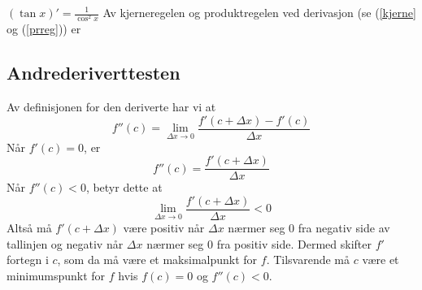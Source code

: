 {\boldmath $ (\tan x)'=\frac{1}{\cos^2 x} $}\bs
Av kjerneregelen og produktregelen ved derivasjon (se (\ref{kjerne} og (\ref{prreg})) er

\subsection*{Andrederiverttesten}
Av definisjonen for den deriverte har vi at
\[ f''(c)=\lim\limits_{\Delta x \to 0}\frac{f'(c+\Delta x)-f'(c)}{\Delta x} \]
Når $ f'(c)=0$, er
\[ f''(c)=\frac{f'(c+\Delta x)}{\Delta x} \]
Når $ f''(c)<0 $, betyr dette at
\[\lim\limits_{\Delta x \to 0} \frac{f'(c+\Delta x)}{\Delta x}<0 \]
Altså må $ f'(c+\Delta x) $ være positiv når $ \Delta x $ nærmer seg 0 fra negativ side av tallinjen og negativ når $ \Delta x $ nærmer seg 0 fra positiv side. Dermed skifter $ f' $ fortegn i $ c $, som da må være et maksimalpunkt for $ f $. Tilsvarende må $ c $ være et minimumspunkt for $ f $ hvis $ {f(c)=0} $ og $ {f''(c)<0} $.
\begin{comment}
Kommentering av ligninger.
\begin{flalign}
& & (a+b)^2&=a^2+2ab+b^2 && \llap{Right justify me!}
\end{flalign}
\subsection*{Infleksjonspunkt}
For å argumentere for at $ f $ går fra konkav/konveks til konveks/konkav i et vendepunkt skal vi bruke følgende teorem:

\textsl{Hvis $ f' $ er økende på et intervall, er $ f $ konveks på dette intervallet. Hvis $ f' $ er synkende på et intervall, er $ f $ konkav på dette intervallet.}

Konkave og konvekse funksjoner er en marginal del av R2-faget, derfor nøyer vi oss med grafen til $ f(x)=\sin x $ og $ f'(x) $ som overbevisning om teoremets gyldighet:
\begin{figure}
\centering
\texttt{[image: \\asym\{konk2]}}
\caption{Grafen til $ f(x)=\sin x $ og $ f'(x)=\cos x $. $ f $ er konkav i intervallet til venstre og konveks i intervallet til høyre.}
\end{figure}
Siden $ f' $ er voksende når $ f''>0 $ og synkende når $ f''<0 $, følger det direkte av teoremet over at $ f $ går fra konveks til konkav når $ f'' $ går fra positiv til negativ, og fra konkav til konveks når $ f'' $ går fra negativ til positiv. For kontinuerlig funksjoner betyr dette at $ f''=0 $ i et infleksjonspunkt, men legg merke til at $ f''(c)=0 $ ikke nødvendigvis betyr at $ f'' $ skifter fortegn i $ c $.


\end{comment}


